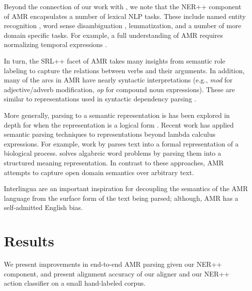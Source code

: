 \documentclass[11pt]{article}
\newcommand\e[1]{\textit{#1}} %
\begin{document}




Beyond the connection of our work with , we note that 
the NER++ component of AMR encapsulates a number of lexical NLP tasks.
These include named entity recognition \cite{2007nadeau-ner,stanford-ner},
  word sense disambiguation \cite{1995yarowsky-wsd,2002banerjee-wsd},
  lemmatization, and a number of more domain specific tasks.
For example, a full understanding of AMR requires normalizing temporal
  expressions \cite{2010verhagen-tempeval,2010strotgen-temporal,2012chang-temporal}.
 
In turn, the SRL++ facet of AMR takes many insights from semantic role labeling
  \cite{2002gildea-srl,2004punyakanok-srl,srikumar2013-srl} to capture the
  relations between verbs and their arguments.
In addition, many of the arcs in AMR have nearly syntactic interpretations
  (e.g., \e{mod} for adjective/adverb modification, \e{op} for compound noun
  expressions).
These are similar to representations used in syntactic dependency parsing
  \cite{stanford-dependencies,2005mcdonald-dependency0,2006buchholz-conll}.

More generally, parsing to a semantic representation is has been explored in
  depth for when the representation is a logical form
  \cite{2005kate-semantics,2005zettlemoyer-semantics,2011liang-semantics}.
Recent work has applied semantic parsing techniques to representations beyond
  lambda calculus expressions.
For example, work by  parses
  text into a formal representation of a biological process.
 solves algabreic word problems by parsing them
  into a structured meaning representation.
In contrast to these approaches, AMR attempts to capture open domain semantics
  over arbitrary text.

Interlingua
  \cite{1991mitamura-interlingua,1999carbonell-interlingua,1998levin-interlingua}
  are an important inspiration for decoupling the semantics of the AMR language
  from the surface form of the text being parsed; although, AMR has a self-admitted
  English bias.




\section{Results}
We present improvements in end-to-end AMR parsing given our NER++ component,
and present alignment accuracy of our aligner and our NER++ action classifier
  on a small hand-labeled corpus.
\end{document}
